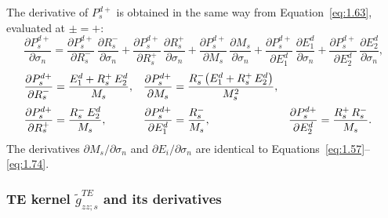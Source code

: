\documentclass[12pt]{report}
\begin{document}
The derivative of \(P_s^{d+}\) is obtained in the same way from
Equation~\eqref{eq:1.63}, evaluated at \(\pm=+\):
\begin{equation}
    \frac{\partial P_s^{d+}}{\partial\sigma_n}
    = \frac{\partial P_s^{d+}}{\partial R_s^-}\,\frac{\partial R_s^-}{\partial\sigma_n}
    + \frac{\partial P_s^{d+}}{\partial R_s^+}\,\frac{\partial R_s^+}{\partial\sigma_n}
    + \frac{\partial P_s^{d+}}{\partial M_s}\,\frac{\partial M_s}{\partial\sigma_n}
    + \frac{\partial P_s^{d+}}{\partial E_1^d}\,\frac{\partial E_1^d}{\partial\sigma_n}
    + \frac{\partial P_s^{d+}}{\partial E_2^d}\,\frac{\partial E_2^d}{\partial\sigma_n},
    \label{eq:1.79}
\end{equation}
\begin{align}
    \frac{\partial P_s^{d+}}{\partial R_s^-}
    &= \frac{E_1^d + R_s^+\,E_2^d}{M_s}, &
    \frac{\partial P_s^{d+}}{\partial M_s}
    &= \frac{R_s^-\!\left(E_1^d + R_s^+\,E_2^d\right)}{M_s^2}, \notag \\[2pt]
    \frac{\partial P_s^{d+}}{\partial R_s^+}
    &= \frac{R_s^-\,E_2^d}{M_s}, &
    \frac{\partial P_s^{d+}}{\partial E_1^d}
    &= \frac{R_s^-}{M_s}, &
    \frac{\partial P_s^{d+}}{\partial E_2^d}
    &= \frac{R_s^+\,R_s^-}{M_s}.
    \label{eq:1.80}
\end{align}
The derivatives \(\partial M_s/\partial\sigma_n\) and
\(\partial E_i/\partial\sigma_n\) are identical to
Equations~\eqref{eq:1.57}--\eqref{eq:1.74}.

\subsubsection{TE kernel \(\tilde{g}^{TE}_{zz;s}\) and its derivatives}
\label{sec:te_kernel}
\end{document}

